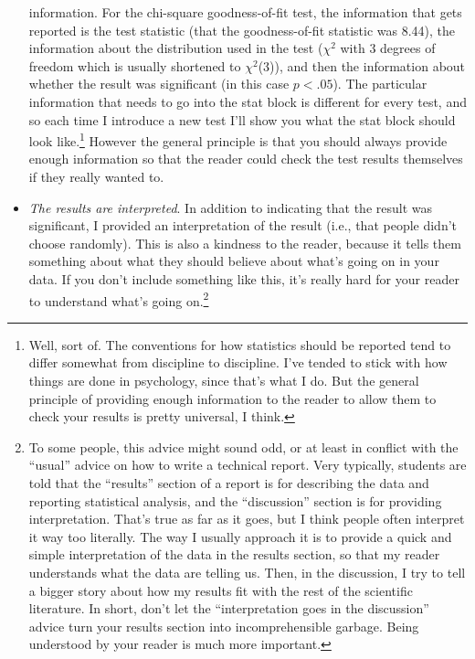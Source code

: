 \documentclass[
  a4paper,
]{book}
\begin{document}
\begin{itemize}
  information. For the chi-square goodness-of-fit test, the information
  that gets reported is the test statistic (that the goodness-of-fit
  statistic was 8.44), the information about the distribution used in
  the test (\(\chi^2\) with 3 degrees of freedom which is usually
  shortened to \(\chi^2\)(3)), and then the information about whether
  the result was significant (in this case \(p< .05\)). The particular
  information that needs to go into the stat block is different for
  every test, and so each time I introduce a new test I'll show you what
  the stat block should look like.\footnote{Well, sort of. The
    conventions for how statistics should be reported tend to differ
    somewhat from discipline to discipline. I've tended to stick with
    how things are done in psychology, since that's what I do. But the
    general principle of providing enough information to the reader to
    allow them to check your results is pretty universal, I think.}
  However the general principle is that you should always provide enough
  information so that the reader could check the test results themselves
  if they really wanted to.
\item
  \emph{The results are interpreted}. In addition to indicating that the
  result was significant, I provided an interpretation of the result
  (i.e., that people didn't choose randomly). This is also a kindness to
  the reader, because it tells them something about what they should
  believe about what's going on in your data. If you don't include
  something like this, it's really hard for your reader to understand
  what's going on.\footnote{To some people, this advice might sound odd,
    or at least in conflict with the ``usual'' advice on how to write a
    technical report. Very typically, students are told that the
    ``results'' section of a report is for describing the data and
    reporting statistical analysis, and the ``discussion'' section is
    for providing interpretation. That's true as far as it goes, but I
    think people often interpret it way too literally. The way I usually
    approach it is to provide a quick and simple interpretation of the
    data in the results section, so that my reader understands what the
    data are telling us. Then, in the discussion, I try to tell a bigger
    story about how my results fit with the rest of the scientific
    literature. In short, don't let the ``interpretation goes in the
    discussion'' advice turn your results section into incomprehensible
    garbage. Being understood by your reader is much more important.}
\end{itemize}
\end{document}
